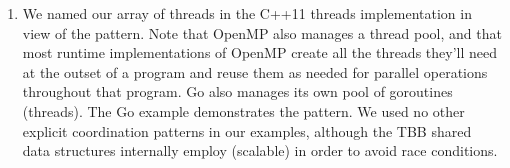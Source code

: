 \documentclass[letterpaper,10pt,openany,oneside]{sphinxmanual}
\begin{document}
\begin{enumerate}
\begin{itemize}
\end{itemize}

\item {} 
We named our array of threads  in the C++11 threads implementation in view of the  pattern. Note that OpenMP also manages a thread pool, and that most runtime implementations of OpenMP create all the threads they’ll need at the outset of a program and reuse them as needed for parallel operations throughout that program. Go also manages its own pool of goroutines (threads). The Go example demonstrates the  pattern. We used no other explicit coordination patterns in our examples, although the TBB shared data structures internally employ (scalable)  in order to avoid race conditions.

\end{enumerate}



\renewcommand{\indexname}{Index}
\printindex
\end{document}
